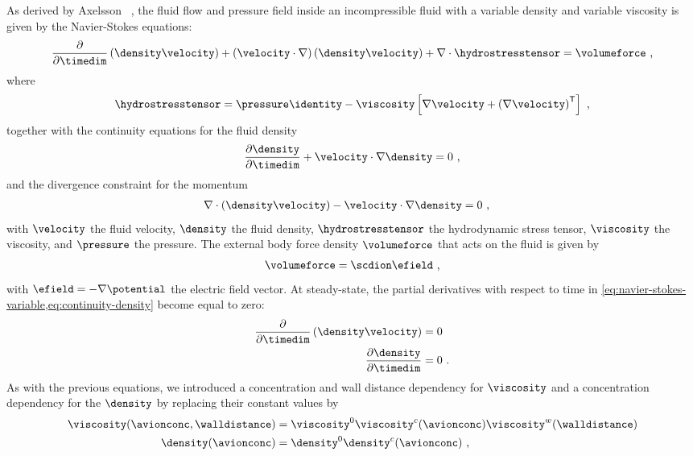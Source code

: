 As derived by Axelsson \etal{}~\cite{Axelsson-2015}, the fluid flow and pressure field inside an
incompressible fluid with a variable density and variable viscosity is given by the Navier-Stokes equations:
%
\begin{align}
  \label{eq:navier-stokes-variable}
  \dfrac{\partial}{\partial \timedim} \left( \density \velocity \right) +
  \left( \velocity \cdot \nabla \right) \left( \density\velocity \right)
  + \nabla \cdot \hydrostresstensor = \volumeforce
  \text{ ,}
\end{align}
%
where
%
\begin{align}
  \hydrostresstensor =
  \pressure\identity - \viscosity\left[\nabla\velocity+\left(\nabla\velocity \right)^\mathsf{T}\right]
  \text{ ,}
\end{align}
%
together with the continuity equations for the fluid density
%
\begin{align}
  \label{eq:continuity-density}
  \dfrac{\partial \density}{\partial \timedim} + \velocity \cdot \nabla \density  = 0
  \text{ ,}
\end{align}
%
and the divergence constraint for the momentum
%
\begin{align}
  \nabla \cdot \left( \density\velocity \right) - \velocity \cdot \nabla \density ={}& 0
  \text{ ,}
\end{align}
%
with $\velocity$ the fluid velocity, $\density$ the fluid density, $\hydrostresstensor$ the hydrodynamic
stress tensor, $\viscosity$ the viscosity, and $\pressure$ the pressure. The external body force density
$\volumeforce$ that acts on the fluid is given by
%
\begin{align}\label{eq:ion_force_density}
  \volumeforce = \scdion \efield
  \text{ ,}
\end{align}
%
with $\efield = - \nabla \potential$ the electric field vector. At steady-state, the partial derivatives with
respect to time in \cref{eq:navier-stokes-variable,eq:continuity-density} become equal to zero:
%
\begin{align}
  \dfrac{\partial}{\partial \timedim} \left( \density \velocity \right) ={}& 0 \\
  \dfrac{\partial \density}{\partial \timedim} ={}& 0
  \text{ .}
\end{align}
%
As with the previous equations, we introduced a concentration and wall distance dependency for $\viscosity$
and a concentration dependency for the $\density$ by replacing their constant values by
%
\begin{align}\label{eq:epnp-ns_viscosity_density}
  \viscosity(\avionconc,\walldistance) ={}&
    \viscosity^0 \viscosity^c(\avionconc) \viscosity^w(\walldistance) \\
  \density(\avionconc) ={}&
    \density^0 \density^c(\avionconc)
  \text{ ,}
\end{align}
